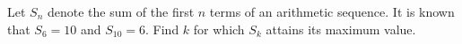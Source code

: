 Let $S_{n}$ denote the sum of the first $n$ terms of an arithmetic sequence. It is known that $S_{6}=10$ and $S_{10}=6$. Find $k$ for which $S_{k}$ attains its maximum value.

